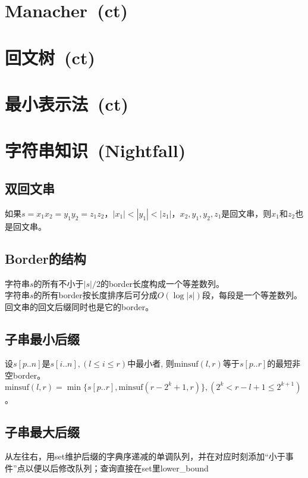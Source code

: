 \section{Manacher\ \small(ct)}

\section{回文树\ \small(ct)}

\section{最小表示法\ \small(ct)}

\section{字符串知识\ \small(Nightfall)}
    \subsection*{双回文串}
        如果$ s = x_1 x_2 = y_1 y_2 = z_1 z_2 $，$ \left|x_1\right| < \left|y_1\right| < \left|z_1\right| $，$ x_2, y_1, y_2, z_1 $是回文串，则$ x_1 $和$ z_2 $也是回文串。
    \subsection*{Border的结构}
        字符串$ s $的所有不小于$ \left|s\right| / 2 $的border长度构成一个等差数列。
        \\字符串$ s $的所有border按长度排序后可分成$ O(\log \left| s \right|) $段，每段是一个等差数列。
        \\回文串的回文后缀同时也是它的border。
    \subsection*{子串最小后缀}
        设$ s[p..n] $是$ s[i..n], (l \leq i \leq r) $中最小者, 则$ \text{minsuf}(l, r) $等于$ s[p..r] $的最短非空border。$ \text{minsuf}(l, r) = \min \lbrace s[p..r], \text{minsuf}(r - 2^k + 1, r) \rbrace, (2^k < r - l + 1 \leq 2^{k + 1} ) $。
    \subsection*{子串最大后缀}
        从左往右，用set维护后缀的字典序递减的单调队列，并在对应时刻添加“小于事件”点以便以后修改队列；查询直接在set里lower\_bound
